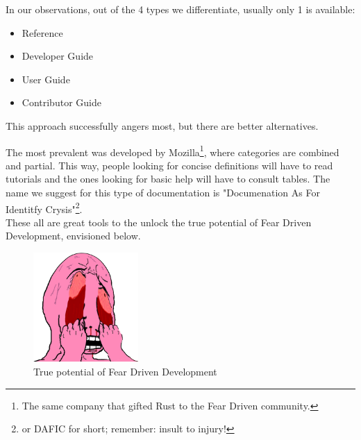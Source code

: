 \documentclass{book}
\begin{document}
    In our observations,
    out of the 4 types we differentiate,
    usually only 1 is available:
    \begin{itemize}
        \itemsep-0.5em 
        \item Reference
        \item Developer Guide
        \item User Guide
        \item Contributor Guide
    \end{itemize}
    This approach successfully angers most,
    but there are better alternatives.

    The most prevalent was developed by Mozilla\footnote{
        The same company that gifted Rust to the Fear Driven community.
    },
    where categories are combined and partial.
    This way,
    people looking for concise definitions will have to read tutorials
    and the ones looking for basic help will have to consult tables.
    The name we suggest for this type of documentation is
    "Documenation As For Identitfy Crysis"\footnote{
        or DAFIC for short; remember: insult to injury!
    }.
    \\

    These all are great tools to the unlock the true potential of Fear Driven Development,
    envisioned below.
    \\

    \begin{figure}[h!]
        \centering
        \includegraphics[width=40mm]{angry-pink-wojak.png}
        \caption{True potential of Fear Driven Development}
        \label{fig:method}
    \end{figure}

\end{document}
